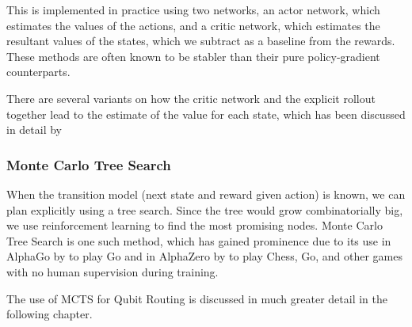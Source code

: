 This is implemented in practice using two networks, an actor network, which estimates the values of the actions, and a critic network, which estimates the resultant values of the states, which we subtract as a baseline from the rewards. These methods are often known to be stabler than their pure policy-gradient counterparts.

There are several variants on how the critic network and the explicit rollout together lead to the estimate of the value for each state, which has been discussed in detail by \cite{actor-critic-a2c, actor-critic-a3c, actor-critic-gae}

\subsubsection{Monte Carlo Tree Search}

When the transition model (next state and reward given action) is known, we can plan explicitly using a tree search. Since the tree would grow combinatorially big, we use reinforcement learning to find the most promising nodes. Monte Carlo Tree Search is one such method, which has gained prominence due to its use in AlphaGo by \cite{mcts-alphago} to play Go and in AlphaZero by \cite{mcts-alphazero} to play Chess, Go, and other games with no human supervision during training. 

The use of MCTS for Qubit Routing is discussed in much greater detail in the following chapter.
